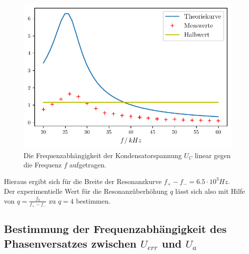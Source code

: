 
\begin{figure}
  \centering
  \includegraphics{build/plotc2.pdf}
  \caption{Die Frequenzabhängigkeit der Kondensatorspannung $U_C$ linear gegen die Frequenz $f$ aufgetragen.}
  \label{fig:plotc2}
\end{figure}

Hieraus ergibt sich für die Breite der Resonanzkurve $f_+ - f_- = 6.5 \cdot 10^3 Hz$. \\
Der experimentielle Wert für die Resonanzüberhöhung $q$ lässt sich also mit Hilfe von $q = \frac{f_0}{f_+ - f_-}$ zu $q = 4$ bestimmen. \\




\subsection{Bestimmung der Frequenzabhängigkeit des Phasenversatzes zwischen $U_{err}$ und $U_{a}$}
\label{Phasenversatz}


